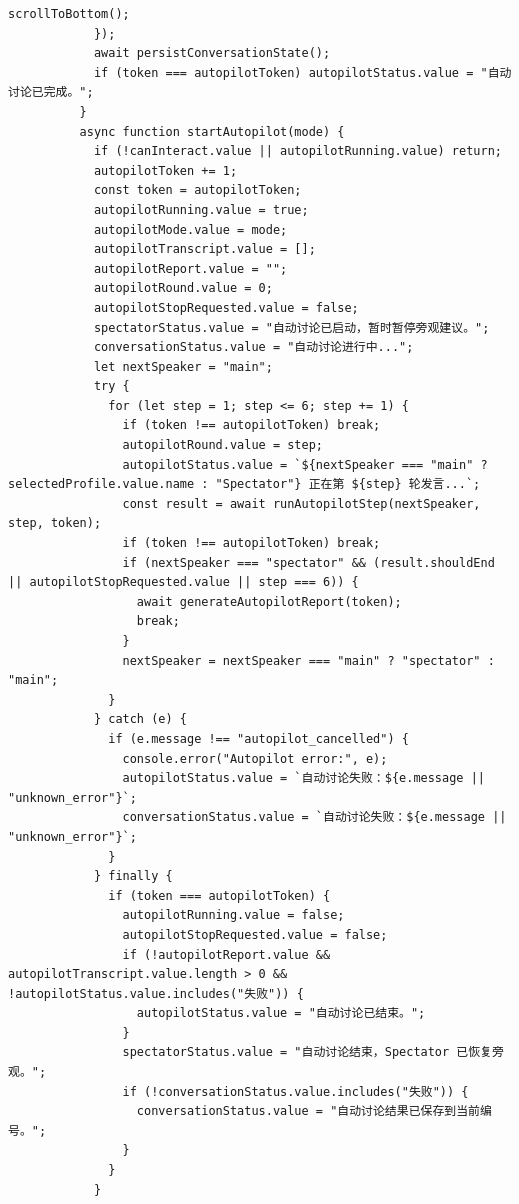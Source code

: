 \documentclass[12pt,a4paper]{article}
\begin{document}
\begin{Verbatim}[fontsize=\footnotesize]
              scrollToBottom();
            });
            await persistConversationState();
            if (token === autopilotToken) autopilotStatus.value = "自动讨论已完成。";
          }
          async function startAutopilot(mode) {
            if (!canInteract.value || autopilotRunning.value) return;
            autopilotToken += 1;
            const token = autopilotToken;
            autopilotRunning.value = true;
            autopilotMode.value = mode;
            autopilotTranscript.value = [];
            autopilotReport.value = "";
            autopilotRound.value = 0;
            autopilotStopRequested.value = false;
            spectatorStatus.value = "自动讨论已启动，暂时暂停旁观建议。";
            conversationStatus.value = "自动讨论进行中...";
            let nextSpeaker = "main";
            try {
              for (let step = 1; step <= 6; step += 1) {
                if (token !== autopilotToken) break;
                autopilotRound.value = step;
                autopilotStatus.value = `${nextSpeaker === "main" ? selectedProfile.value.name : "Spectator"} 正在第 ${step} 轮发言...`;
                const result = await runAutopilotStep(nextSpeaker, step, token);
                if (token !== autopilotToken) break;
                if (nextSpeaker === "spectator" && (result.shouldEnd || autopilotStopRequested.value || step === 6)) {
                  await generateAutopilotReport(token);
                  break;
                }
                nextSpeaker = nextSpeaker === "main" ? "spectator" : "main";
              }
            } catch (e) {
              if (e.message !== "autopilot_cancelled") {
                console.error("Autopilot error:", e);
                autopilotStatus.value = `自动讨论失败：${e.message || "unknown_error"}`;
                conversationStatus.value = `自动讨论失败：${e.message || "unknown_error"}`;
              }
            } finally {
              if (token === autopilotToken) {
                autopilotRunning.value = false;
                autopilotStopRequested.value = false;
                if (!autopilotReport.value && autopilotTranscript.value.length > 0 && !autopilotStatus.value.includes("失败")) {
                  autopilotStatus.value = "自动讨论已结束。";
                }
                spectatorStatus.value = "自动讨论结束，Spectator 已恢复旁观。";
                if (!conversationStatus.value.includes("失败")) {
                  conversationStatus.value = "自动讨论结果已保存到当前编号。";
                }
              }
            }
\end{Verbatim}
\end{document}
